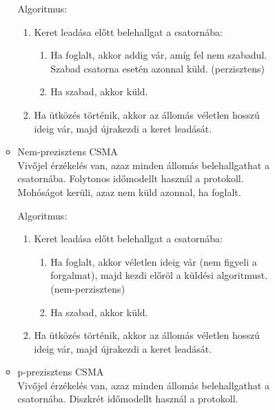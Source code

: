 \documentclass[margin=0px]{article}
\begin{document}
\begin{description}
\begin{description}
\begin{itemize}
\begin{itemize}
                                    Algoritmus:
                                    \begin{enumerate}
                                        \item Keret leadása előtt belehallgat a csatornába:
                                              \begin{enumerate}
                                                  \item Ha foglalt, akkor addig vár, amíg fel nem szabadul. Szabad csatorna esetén azonnal küld. (perzisztens)
                                                  \item Ha szabad, akkor küld.
                                              \end{enumerate}
                                        \item Ha ütközés történik, akkor az állomás véletlen hosszú ideig vár, majd újrakezdi a keret leadását.
                                    \end{enumerate}
                              \item Nem-prezisztens CSMA \\
                                    Vivőjel érzékelés van, azaz minden állomás belehallgathat a csatornába. Folytonos időmodellt használ a protokoll. Mohóságot kerüli, azaz nem küld azonnal, ha foglalt.

                                    Algoritmus:
                                    \begin{enumerate}
                                        \item Keret leadása előtt belehallgat a csatornába:
                                              \begin{enumerate}
                                                  \item Ha foglalt, akkor véletlen ideig vár (nem figyeli a forgalmat), majd kezdi előröl a küldési algoritmust. (nem-perzisztens)
                                                  \item Ha szabad, akkor küld.
                                              \end{enumerate}
                                        \item Ha ütközés történik, akkor az állomás véletlen hosszú ideig vár, majd újrakezdi a keret leadását.
                                    \end{enumerate}
                              \item p-prezisztens CSMA \\
                                    Vivőjel érzékelés van, azaz minden állomás belehallgathat a csatornába. Diszkrét időmodellt használ a protokoll.


\end{itemize}
\end{itemize}
\end{description}
\end{description}
\end{document}
